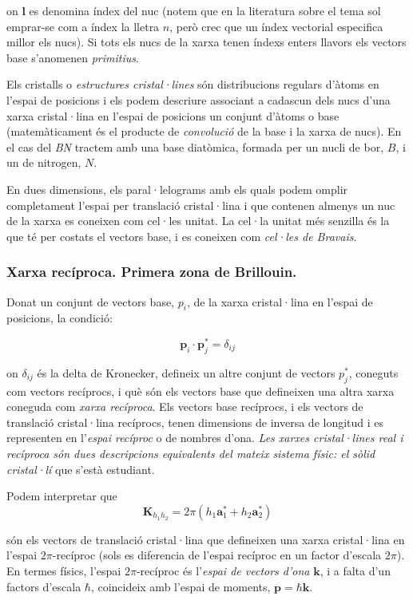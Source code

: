 \documentclass[12pt]{article} %
\let\vec\mathbf %
\begin{document}
on $\vec l$ es denomina índex del nuc (notem que en la literatura sobre el tema sol emprar-se com a índex la lletra $n$, però crec que un índex vectorial especifica millor els nucs). Si tots els nucs de la xarxa tenen índexs enters llavors els vectors base s'anomenen \emph{primitius}.

Els cristalls o \emph{estructures cristal·lines} són distribucions regulars d'àtoms en l'espai de posicions i els podem descriure associant a cadascun dels nucs d'una xarxa cristal·lina en l'espai de posicions un conjunt d'àtoms o base (matemàticament és el producte de \emph{convolució} de la base i la xarxa de nucs). En el cas del \emph{BN} tractem amb una base diatòmica, formada per un nucli de bor, $B$, i un de nitrogen, $N$. 

En dues dimensions, els paral·lelograms amb els quals podem omplir completament l'espai per translació cristal·lina i que contenen almenys un nuc de la xarxa es coneixen com cel·les unitat. La cel·la unitat més senzilla és la que té per costats el vectors base, i es coneixen com \emph{cel·les de Bravais}.

\subsubsection{Xarxa recíproca. Primera zona de Brillouin.}
Donat un conjunt de vectors base, $p_i$, de la xarxa cristal·lina en l'espai de posicions, la condició:

\begin{equation}
\label{eq:rec1}
\vec p_i\cdot\vec p_j^{*}=\delta_{ij}
\end{equation}

on $\delta_{ij}$ és la delta de Kronecker, defineix un altre conjunt de vectors $p_j^*$, coneguts com vectors recíprocs, i què són els vectors base que defineixen una altra xarxa coneguda com \textit{xarxa recíproca}. Els  vectors base recíprocs, i els vectors de translació cristal·lina recíprocs, tenen dimensions de inversa de longitud i es representen en l'\textit{espai recíproc} o de nombres d'ona. \textit{Les xarxes cristal·lines real i recíproca són dues descripcions equivalents del mateix sistema físic: el sòlid cristal·lí} que s'està estudiant.

Podem interpretar que
\begin{equation}
\label{eq:rec3}
\vec K_{h_1h_2}=2\pi\left(h_1\vec a_1^{*}+h_2\vec a_2^{*}\right)
\end{equation}

són els vectors de translació cristal·lina que defineixen una xarxa cristal·lina en l'espai $2\pi$-recíproc (sols es diferencia de l'espai recíproc en un factor d'escala $2\pi$). En termes físics, l'espai $2\pi$-recíproc és l'\emph{espai de vectors d'ona} $\vec k$, i a falta d'un factors d'escala $\hbar$, coincideix amb l'espai de moments,  $\vec p=\hbar\vec k$.
\end{document}
